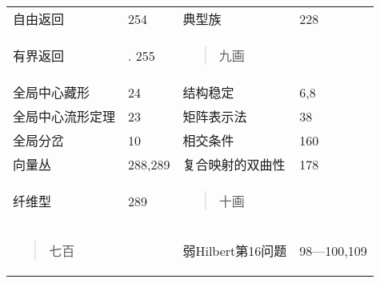 \begin{longtable}[]{@{}llll@{}}
\toprule
\endhead
自由返回 & 254 & 典型族 & 228\tabularnewline
\begin{minipage}[t]{0.22\columnwidth}\raggedright
有界返回\strut
\end{minipage} & \begin{minipage}[t]{0.22\columnwidth}\raggedright
. 255\strut
\end{minipage} & \begin{minipage}[t]{0.22\columnwidth}\raggedright
\begin{quote}
九画
\end{quote}\strut
\end{minipage} & \begin{minipage}[t]{0.22\columnwidth}\raggedright
\strut
\end{minipage}\tabularnewline
全局中心藏形 & 24 & 结构稳定 & 6,8\tabularnewline
全局中心流形定理 & 23 & 矩阵表示法 & 38\tabularnewline
全局分岔 & 10 & 相交条件 & 160\tabularnewline
向量丛 & 288,289 & 复合映射的双曲性 & 178\tabularnewline
\begin{minipage}[t]{0.22\columnwidth}\raggedright
纤维型\strut
\end{minipage} & \begin{minipage}[t]{0.22\columnwidth}\raggedright
289\strut
\end{minipage} & \begin{minipage}[t]{0.22\columnwidth}\raggedright
\begin{quote}
十画
\end{quote}\strut
\end{minipage} & \begin{minipage}[t]{0.22\columnwidth}\raggedright
\strut
\end{minipage}\tabularnewline
\begin{minipage}[t]{0.22\columnwidth}\raggedright
\begin{quote}
七百
\end{quote}\strut
\end{minipage} & \begin{minipage}[t]{0.22\columnwidth}\raggedright
\strut
\end{minipage} & \begin{minipage}[t]{0.22\columnwidth}\raggedright
弱Hilbert第16问题\strut
\end{minipage} & \begin{minipage}[t]{0.22\columnwidth}\raggedright
98---100,109\strut
\end{minipage}\tabularnewline

\end{longtable}
